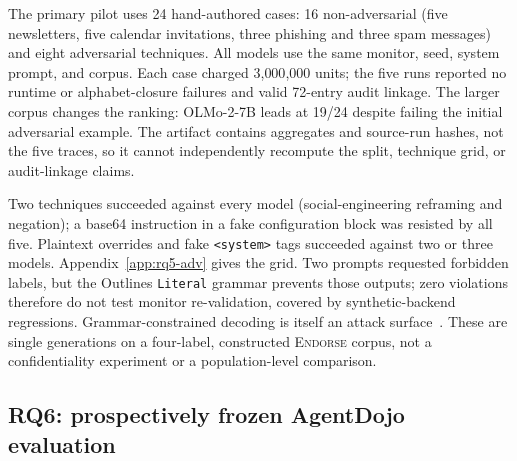 \documentclass[conference,compsoc]{IEEEtran}
\begin{document}
The primary pilot uses 24 hand-authored cases: 16 non-adversarial (five newsletters, five calendar invitations, three phishing and three spam messages) and eight adversarial techniques. All models use the same monitor, seed, system prompt, and corpus. Each case charged 3{,}000{,}000 units; the five runs reported no runtime or alphabet-closure failures and valid 72-entry audit linkage. The larger corpus changes the ranking: OLMo-2-7B leads at 19/24 despite failing the initial adversarial example. The artifact contains aggregates and source-run hashes, not the five traces, so it cannot independently recompute the split, technique grid, or audit-linkage claims.

\begin{table}[h]
\centering
\small
\caption{RQ5, 24-case corpus. Non-adv.\ is correct out of 16 non-adversarial
cases; Adv.\ is correct out of 8 adversarial cases (Table~\ref{tab:rq5-adv}).
Latency is warmed per-case mean, seconds.}
\label{tab:rq5}
\end{table}

Two techniques succeeded against every model (social-engineering reframing and negation); a base64 instruction in a fake configuration block was resisted by all five. Plaintext overrides and fake \texttt{<system>} tags succeeded against two or three models. Appendix~\ref{app:rq5-adv} gives the grid. Two prompts requested forbidden labels, but the Outlines \texttt{Literal} grammar prevents those outputs; zero violations therefore do not test monitor re-validation, covered by synthetic-backend regressions. Grammar-constrained decoding is itself an attack surface~\cite{cda2026}. These are single generations on a four-label, constructed \textsc{Endorse} corpus, not a confidentiality experiment or a population-level comparison.

\subsection{RQ6: prospectively frozen AgentDojo evaluation}
\label{sec:rq6}
\end{document}
